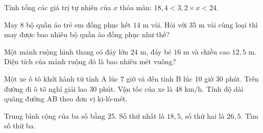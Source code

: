 \begin{ex} %
Tính tổng các giá trị tự nhiên của $x$ thỏa mãn: $18{,}4 < 3{,}2 \times x < 24$.
\end{ex}

\begin{ex} %
May 8 bộ quần áo trẻ em đồng phục hết $14\text{ m}$ vải. Hỏi với $35\text{ m}$ vải cùng loại thì may được bao nhiêu bộ quần áo đồng phục như thế?
\end{ex}

\begin{ex} %
Một mảnh ruộng hình thang có đáy lớn $24\text{ m}$, đáy bé $16\text{ m}$ và chiều cao $12{,}5\text{ m}$. Diện tích của mảnh ruộng đó là bao nhiêu mét vuông?
\end{ex}

\begin{ex} %
Một xe ô tô khởi hành từ tỉnh A lúc 7 giờ và đến tỉnh B lúc 10 giờ 30 phút. Trên đường đi ô tô nghỉ giải lao 30 phút. Vận tốc của xe là $48\text{ km/h}$. Tính độ dài quãng đường AB theo đơn vị ki-lô-mét.
\end{ex}

\begin{ex} %
Trung bình cộng của ba số bằng $25$. Số thứ nhất là $18{,}5$, số thứ hai là $26{,}5$. Tìm số thứ ba.
\end{ex}
